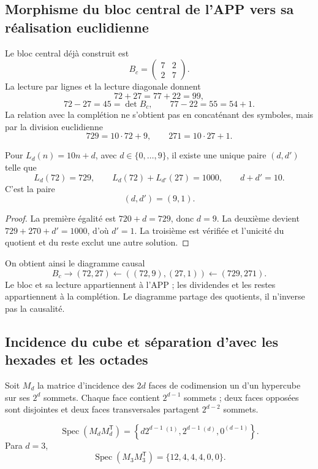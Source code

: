 \subsection{Morphisme du bloc central de l’APP vers sa réalisation euclidienne}

Le bloc central déjà construit est
\[
 B_c=\begin{pmatrix}7&2\\2&7\end{pmatrix}.
\]
La lecture par lignes et la lecture diagonale donnent
\[
 72+27=77+22=99,
\]
\[
 72-27=45=\det B_c,
 \qquad
 77-22=55=54+1.
\]
La relation avec la complétion ne s’obtient pas en concaténant des symboles, mais
par la division euclidienne
\[
 729=10\cdot72+9,
 \qquad
 271=10\cdot27+1.
\]

\begin{theorem}
\label{p12-83-c1-s5:thm:levantamiento-decimal-emrh-autonomo}
Pour \(L_d(n)=10n+d\), avec \(d\in\{0,\ldots,9\}\), il existe une unique paire
\((d,d')\) telle que
\[
 L_d(72)=729,
 \qquad
 L_d(72)+L_{d'}(27)=1000,
 \qquad
 d+d'=10.
\]
C’est la paire
\[
 (d,d')=(9,1).
\]
\end{theorem}

\begin{proof}
La première égalité est \(720+d=729\), donc \(d=9\). La deuxième devient
\(729+270+d'=1000\), d’où \(d'=1\). La troisième est vérifiée et
l’unicité du quotient et du reste exclut une autre solution.
\end{proof}

On obtient ainsi le diagramme causal
\[
 B_c\longrightarrow(72,27)
 \longleftarrow((72,9),(27,1))
 \longleftarrow(729,271).
\]
Le bloc et sa lecture appartiennent à l’APP ; les dividendes et les restes appartiennent
à la complétion. Le diagramme partage des quotients, il n’inverse pas la
causalité.

\subsection{Incidence du cube et séparation d’avec les hexades et les octades}

Soit \(M_d\) la matrice d’incidence des \(2d\) faces de codimension un
d’un hypercube sur ses \(2^d\) sommets. Chaque face contient
\(2^{d-1}\) sommets ; deux faces opposées sont disjointes et deux faces
transversales partagent \(2^{d-2}\) sommets.

\begin{theorem}
\label{p12-83-c1-s5:thm:espectro-incidencia-cubo-autonomo}
\[
 \operatorname{Spec}(M_dM_d^{\mathsf T})
 =\left\{
 d2^{d-1}\,^{(1)},
 2^{d-1}\,^{(d)},
 0^{(d-1)}
 \right\}.
\]
Para \(d=3\),
\[
 \operatorname{Spec}(M_3M_3^{\mathsf T})
 =\{12,4,4,4,0,0\}.
\]
\end{theorem}

